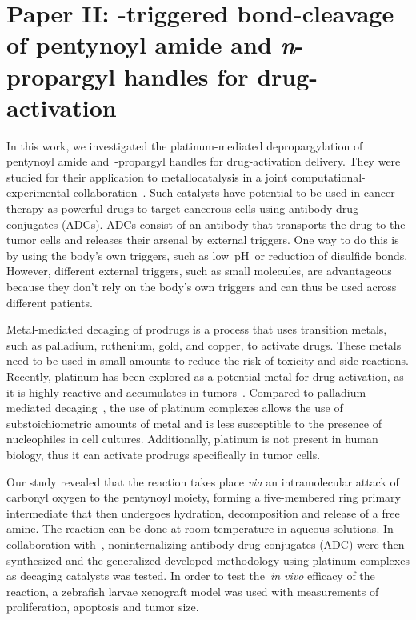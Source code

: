 \chapter[Paper II:\@
  platinum-triggered bond-cleavage of pentynoyl amide
  and \emph{n}-propargyl handles for drug-activation]{Paper II:\@
  -triggered bond-cleavage of pentynoyl amide
  and \emph{n}-propargyl handles for drug-activation
 }%
\label{ch:paper2}

\begin{citacao}
\end{citacao}

In this work,
we investigated the platinum-mediated depropargylation of pentynoyl amide
and~-propargyl handles for drug-activation delivery.
They were studied for their application to metallocatalysis in a joint computational-experimental collaboration~\cite{Oliveira_2020}.
Such catalysts have potential to be used in cancer therapy as powerful drugs to target cancerous cells using antibody-drug conjugates (ADCs).
ADCs consist of an antibody that transports the drug to the tumor cells
and releases their arsenal by external triggers.
One way to do this is by using the body's own triggers,
such as low~pH~or reduction of disulfide bonds.
However,
different external triggers,
such as small molecules,
are advantageous because they don't rely on the body's own triggers and can thus be used across different patients.

Metal-mediated decaging of prodrugs is a process that uses transition metals,
such as palladium,
ruthenium,
gold,
and copper,
to activate drugs.
These metals need to be used in small amounts to reduce the risk of toxicity and side reactions.
Recently,
platinum has been explored as a potential metal for drug activation,
as it is highly reactive and accumulates in tumors~\cite{Miller_2017,Oliveira_2020}.
Compared to palladium-mediated decaging~\cite{Coelho_2019},
the use of platinum complexes allows the use of substoichiometric amounts of metal
and is less susceptible to the presence of nucleophiles in cell cultures.
Additionally,
platinum is not present in human biology,
thus it can activate prodrugs specifically in tumor cells.

Our study revealed that the reaction takes place \emph{via} an intramolecular
attack of carbonyl oxygen to the pentynoyl moiety,
forming a five-membered ring primary intermediate that then undergoes hydration,
decomposition and release of a free amine.
The reaction can be done at room temperature in aqueous solutions.
In collaboration with~\citeauthor{Oliveira_2020},
noninternalizing antibody-drug conjugates (ADC)
were then synthesized
and the generalized developed methodology using platinum complexes as decaging catalysts
was tested.
In order to test the~\emph{in vivo} efficacy of the reaction,
a zebrafish larvae xenograft model was used with measurements of proliferation,
apoptosis and tumor size.

